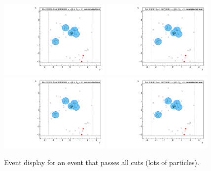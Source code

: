 \begin{figure}[h!]
  \centering
  \includegraphics[page=21,width=0.48\textwidth]{figures/EventDisplays.pdf}
  \includegraphics[page=22,width=0.48\textwidth]{figures/EventDisplays.pdf} \\
  \includegraphics[page=24,width=0.48\textwidth]{figures/EventDisplays.pdf}
  \includegraphics[page=25,width=0.48\textwidth]{figures/EventDisplays.pdf}
  \caption{Event display for an event that passes all cuts (lots of particles).}
  \label{fig:event-display-3}
\end{figure}

